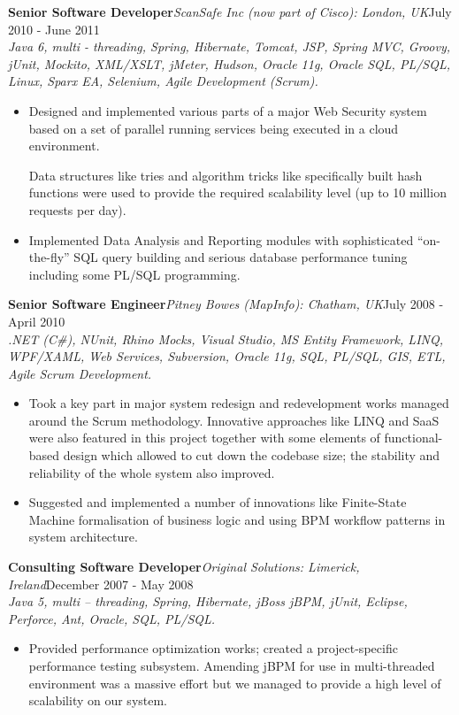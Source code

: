 \documentclass{res}
\newcommand{\jobdes}[4]{\needspace{3\baselineskip}%
{\noindent \bf #3\hspace{2ex}}{{\em \small #1}}{\hfill #2}\\{{\it \small #4.}}}
\newif\ifFullVersion
\begin{document}
\begin{resume}
\jobdes{ScanSafe Inc (now part of Cisco): London, UK}{July 2010 - June 2011}{Senior Software Developer}
{Java 6, multi - threading, Spring, Hibernate, Tomcat, JSP, Spring MVC, Groovy, jUnit, Mockito, XML/XSLT, jMeter, Hudson, Oracle 11g, Oracle SQL, PL/SQL, Linux, Sparx EA, Selenium, Agile Development (Scrum)}
\begin{itemize} \itemsep -2pt %
 \item Designed and implemented various parts of a major Web Security system based on a set of parallel running services being executed in a cloud environment.
 \ifFullVersion
   This included a lot of re-design work, particularly switching from the standard Java objects to the immutable structures in combination with elements of functional-oriented programming.
\fi
Data structures like tries and algorithm tricks like specifically built hash functions were used to provide the required scalability level (up to 10 million requests per day).
 \item Implemented Data Analysis and Reporting modules with sophisticated “on-the-fly” SQL query building and serious database performance tuning including some PL/SQL programming.
\end{itemize}

\jobdes{Pitney Bowes (MapInfo): Chatham, UK}{July 2008 - April 2010}{Senior Software Engineer}
{.NET (C\#), NUnit, Rhino Mocks, Visual Studio, MS Entity Framework, LINQ, WPF/XAML, Web Services, Subversion, Oracle 11g, SQL, PL/SQL, GIS, ETL, Agile Scrum Development}
\begin{itemize} \itemsep -2pt %
 \item Took a key part in major system redesign and redevelopment works managed around the Scrum methodology. Innovative approaches like LINQ and SaaS were also featured in this project together with some elements of functional-based design which allowed to cut down the codebase size; the stability and reliability of the whole system also improved.
 \item Suggested and implemented a number of innovations like Finite-State Machine formalisation of business logic and using BPM workflow patterns in system architecture.
\end{itemize}

\jobdes {Original Solutions: Limerick, Ireland}{December 2007 - May 2008}{Consulting Software Developer}
{Java 5, multi – threading, Spring, Hibernate, jBoss jBPM, jUnit, Eclipse, Perforce, Ant, Oracle, SQL, PL/SQL}
\begin{itemize} \itemsep -2pt %
 \item Provided performance optimization works; created a project-specific performance testing subsystem. Amending jBPM for use in multi-threaded environment was a massive effort but we managed to provide a high level of scalability on our system.
\end{itemize}


\end{resume}
\end{document}
